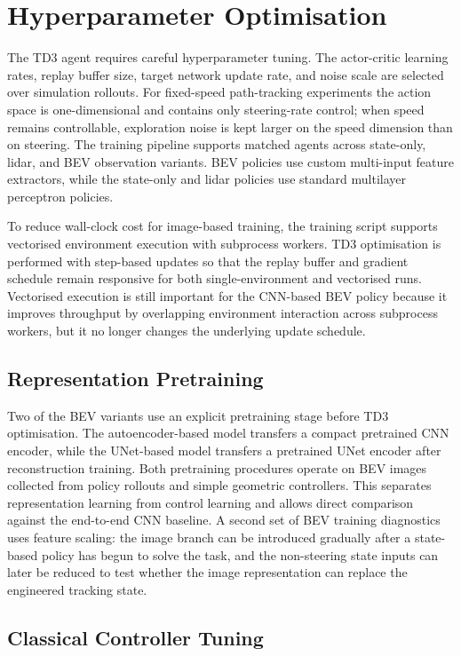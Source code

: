 \section{Hyperparameter Optimisation}

The TD3 agent requires careful hyperparameter tuning. The actor-critic learning rates, replay buffer size, target network update rate, and noise scale are selected over simulation rollouts. For fixed-speed path-tracking experiments the action space is one-dimensional and contains only steering-rate control; when speed remains controllable, exploration noise is kept larger on the speed dimension than on steering. The training pipeline supports matched agents across state-only, lidar, and BEV observation variants. BEV policies use custom multi-input feature extractors, while the state-only and lidar policies use standard multilayer perceptron policies.

To reduce wall-clock cost for image-based training, the training script supports vectorised environment execution with subprocess workers. TD3 optimisation is performed with step-based updates so that the replay buffer and gradient schedule remain responsive for both single-environment and vectorised runs. Vectorised execution is still important for the CNN-based BEV policy because it improves throughput by overlapping environment interaction across subprocess workers, but it no longer changes the underlying update schedule.

\subsection{Representation Pretraining}

Two of the BEV variants use an explicit pretraining stage before TD3 optimisation. The autoencoder-based model transfers a compact pretrained CNN encoder, while the UNet-based model transfers a pretrained UNet encoder after reconstruction training. Both pretraining procedures operate on BEV images collected from policy rollouts and simple geometric controllers. This separates representation learning from control learning and allows direct comparison against the end-to-end CNN baseline. A second set of BEV training diagnostics uses feature scaling: the image branch can be introduced gradually after a state-based policy has begun to solve the task, and the non-steering state inputs can later be reduced to test whether the image representation can replace the engineered tracking state.

\subsection{Classical Controller Tuning}

